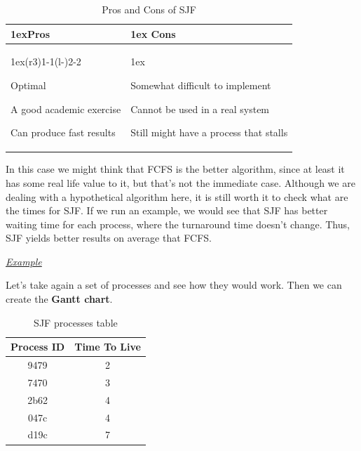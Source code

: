 \documentclass{article}
\begin{document}
\begin{table}[H]
  \begin{tabularx}{\linewidth}{>{\parskip1ex}X@{\kern4\tabcolsep}>{\parskip1ex}X}
    \toprule
    \hfil\bfseries Pros & \hfil\bfseries Cons \\
    \cmidrule(r{3\tabcolsep}){1-1}\cmidrule(l{-\tabcolsep}){2-2}

    Optimal\par
    A good academic exercise\par
    Can produce fast results\par

    &

    Somewhat difficult to implement\par
    Cannot be used in a real system\par
    Still might have a process that stalls \\
    \bottomrule
  \end{tabularx}
  \caption{Pros and Cons of SJF}
\end{table}

In this case we might think that FCFS is the better algorithm, since at least it has some real life value to it, but that's not the immediate case. Although we are dealing with a hypothetical algorithm here, it is still worth it to check what are the times for SJF. If we run an example, we would see that SJF has better waiting time for each process, where the turnaround time doesn't change. Thus, SJF yields better results on average that FCFS.

\underline{\textit{Example}}

Let's take again a set of processes and see how they would work. Then we can create the \textbf{Gantt chart}.

\begin{table}[H]
  \begin{center}
    \label{tab:SJF processes}
    \begin{tabular}{c|c}
      \toprule
      \textbf{Process ID} & \textbf{Time To Live} \\
      \midrule
      9479 & 2 \\
      7470 & 3 \\
      2b62 & 4 \\
      047c & 4 \\
      d19c & 7 \\
      \bottomrule
    \end{tabular}
    \caption{SJF processes table}
  \end{center}
\end{table}
\end{document}
